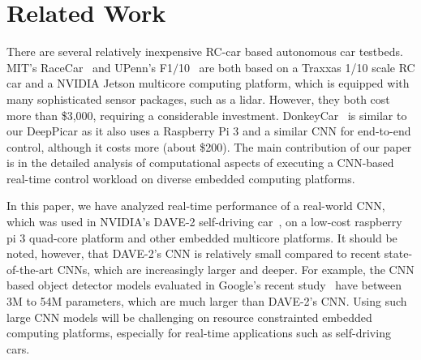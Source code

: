 \section{Related Work}\label{sec:related}


There are several relatively inexpensive RC-car based autonomous car
testbeds. MIT's RaceCar~\cite{shin2017project} and UPenn's
F1$/$10~\cite{upennf1tenth} are both based on a Traxxas 1/10 scale RC
car and a NVIDIA Jetson multicore computing platform, which
is equipped with many sophisticated sensor packages, such as a lidar.
However, they both cost more than \$3,000, requiring a considerable
investment. DonkeyCar~\cite{donkeycar} is similar to our DeepPicar as
it also uses a Raspberry Pi 3 and a similar CNN for end-to-end
control, although it costs more (about \$200).
The main contribution of our paper is in the detailed analysis of
computational aspects of executing a CNN-based real-time control
workload on diverse embedded computing platforms.

In this paper, we have analyzed real-time performance of a real-world
CNN, which was used in NVIDIA's DAVE-2 self-driving
car~\cite{Bojarski2016}, on a low-cost raspberry pi 3 quad-core 
platform and other embedded multicore platforms. It should be noted, 
however, that DAVE-2's CNN is relatively small compared
to recent state-of-the-art CNNs, which are increasingly larger and
deeper. For example, the CNN based object detector models evaluated in
Google's recent study~\cite{huang2017speed} have between 3M to 54M
parameters, which are much larger than DAVE-2's CNN.
Using such large CNN models will be challenging on
resource constrainted embedded computing platforms, especially for
real-time applications such as self-driving cars.

